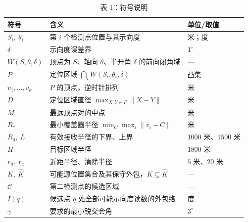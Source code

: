 \begin{table}[htbp]
\centering
\caption{表 1：符号说明}

\small
\begin{tabularx}{\linewidth}{@{}p{29mm}X p{24mm}@{}}
\toprule
符号 & 含义 & 单位/取值 \\
\midrule
$S_i,\ \theta_i$ & 第 $i$ 个检测点位置与其示向度 & 米；度 \\
$\delta$ & 示向度误差界 & $1^\circ$ \\
$W(S,\theta,\delta)$ & 顶点为 $S$、轴向 $\theta$、半开角 $\delta$ 的前向闭角域 & — \\
$P$ & 定位区域 $\bigcap_i W(S_i,\theta_i,\delta)$ & 凸集 \\
$v_1,\dots,v_k$ & $P$ 的顶点，逆时针排列 & 米 \\
$D$ & 定位区域直径 $\max_{X,Y\in P}\lVert X-Y\rVert$ & 米 \\
$M$ & 最远顶点对的中点 & 米 \\
$R_*$ & 最小覆盖圆半径 $\min_C\max_i\lVert v_i-C\rVert$ & 米 \\
$R_0,\ L$ & 有效接收半径的下界、上界 & $1000$ 米、$1500$ 米 \\
$H$ & 目标区域半径 & $1800$ 米 \\
$r_n,\ r_x$ & 近距半径、清除半径 & $5$ 米、$20$ 米 \\
$K,\ \widehat K$ & 可能源位置集合及其保守外包，$K\subseteq\widehat K$ & — \\
$\mathcal C$ & 第二检测点的候选区域 & — \\
$I(q)$ & 候选点 $q$ 处全部可能示向度读数的外包络 & 度 \\
$\gamma$ & 要求的最小锐交会角 & $3^\circ$ \\
\bottomrule
\end{tabularx}

\end{table}
